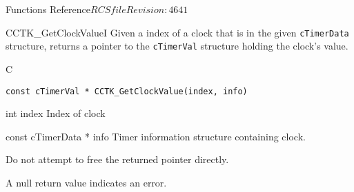 \begin{cactuspart}{ Functions Reference}{$RCSfile$}{$Revision: 4641 $}
\begin{FunctionDescription}{CCTK\_GetClockValueI}
\label{CCTK-GetClockValueI}
Given a index of a clock that is
in the given {\tt cTimerData} structure,
returns a pointer to the {\tt cTimerVal} structure holding the clock's value.
\begin{SynopsisSection}
\begin{Synopsis}{C}
\begin{verbatim}
const cTimerVal * CCTK_GetClockValue(index, info)
\end{verbatim}
\end{Synopsis}
\end{SynopsisSection}

\begin{ParameterSection}
\begin{Parameter} {int index}
Index of clock
\end{Parameter}

\begin{Parameter} {const cTimerData * info}
Timer information structure containing clock.
\end{Parameter}
\end{ParameterSection}

\begin{Discussion}
Do not attempt to free the returned pointer directly.
\end{Discussion}
\begin{ErrorSection}
\begin{Error}
A null return value indicates an error.
\end{Error}
\end{ErrorSection}
\end{FunctionDescription}



\end{cactuspart}
